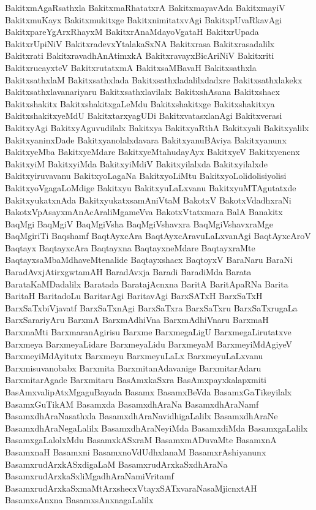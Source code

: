 {BakitxmAgaRsathxla
BakitxmaRhatatxrA
BakitxmayavAda
BakitxmayiV
BakitxmuKayx
Bakitxmukitxge
BakitxnimitatxvAgi
BakitxpUvaRkavAgi
BakitxpareYgArxRhayxM
BakitxrAnaMdayoVgataH
BakitxrUpada
BakitxrUpiNiV
BakitxradevxYtalakaSxNA
Bakitxrasa
Bakitxrasadalilx
Bakitxrati
BakitxravadhAnAtimxkA
BakitxravayxBicAriNiV
Bakitxriti
BakitxrucayxteV
BakitxrutatxmA
BakitxsaMBavaH
Bakitxsathxla
BakitxsathxlaM
Bakitxsathxlada
Bakitxsathxladalilxdadxre
Bakitxsathxlakekx
Bakitxsathxlavanariyaru
Bakitxsathxlavilalx
BakitxshAsana
Bakitxshacx
Bakitxshakitx
BakitxshakitxgaLeMdu
Bakitxshakitxge
Bakitxshakitxya
BakitxshakitxyeMdU
BakitxtarxyagUDi
BakitxvatasxlanAgi
Bakitxverasi
BakitxyAgi
BakitxyAguvudilalx
Bakitxya
BakitxyaRthA
Bakitxyali
Bakitxyalilx
BakitxyaninxDade
Bakitxyanolalxdavara
BakitxyanuBAviya
Bakitxyanunx
BakitxyeMba
BakitxyeMdare
BakitxyeMtahudayAyx
BakitxyeV
Bakitxyenenx
BakitxyiM
BakitxyiMda
BakitxyiMdiV
Bakitxyilalxda
Bakitxyilalxde
Bakitxyiruvavanu
BakitxyoLagaNa
BakitxyoLiMtu
BakitxyoLolidolisiyolisi
BakitxyoVgagaLoMdige
Bakitxyu
BakitxyuLaLxvanu
BakitxyuMTAgutatxde
BakitxyukatxnAda
BakitxyukatxsamAniVtaM
BakotxV
BakotxVdadhxraNi
BakotxVpAsayxmAnAcAraliMgameVva
BakotxVtatxmara
BalA
Banakitx
BaqMgi
BaqMgiV
BaqMgiVsha
BaqMgiVshavxra
BaqMgiVshavxraMge
BaqMgiriTi
Baqshamf
BaqtAyxcAra
BaqtAyxcAravuLaLxvanAgi
BaqtAyxcAroV
Baqtayx
BaqtayxcAra
Baqtayxna
BaqtayxneMdare
BaqtayxraMte
BaqtayxsaMbaMdhaveMtenalide
Baqtayxshacx
BaqtoyxV
BaraNaru
BaraNi
BaradAvxjAtirxgwtamAH
BaradAvxja
Baradi
BaradiMda
Barata
BarataKaMDadalilx
Baratada
BaratajAcnxna
BaritA
BaritApaRNa
Barita
BaritaH
BaritadoLu
BaritarAgi
BaritavAgi
BarxSATxH
BarxSaTxH
BarxSaTxbiVjavatf
BarxSaTxnAgi
BarxSaTxra
BarxSaTxru
BarxSaTxrugaLa
BarxSarariyAru
BarxmA
BarxmAdhiVna
BarxmAdhiVnaru
BarxmaH
BarxmaMti
BarxmaranAgirisu
Barxme
BarxmegaLigU
BarxmegaLirutatxve
Barxmeya
BarxmeyaLidare
BarxmeyaLidu
BarxmeyaM
BarxmeyiMdAgiyeV
BarxmeyiMdAyitutx
Barxmeyu
BarxmeyuLaLx
BarxmeyuLaLxvanu
Barxmisuvanobabx
Barxmita
BarxmitanAdavanige
BarxmitarAdaru
BarxmitarAgade
Barxmitaru
BasAmxkaSxra
BasAmxpayxkalapxmiti
BasAmxvalipAtxMgaguBayada
Basamx
BasamxBeVda
BasamxGaTikeyilalx
BasamxGuTikAM
Basamxda
BasamxdhAraNa
BasamxdhAraNamf
BasamxdhAraNasathxla
BasamxdhAraNavidhigaLalilx
BasamxdhAraNe
BasamxdhAraNegaLalilx
BasamxdhAraNeyiMda
BasamxdiMda
BasamxgaLalilx
BasamxgaLalolxMdu
BasamxkASxraM
BasamxmADuvaMte
BasamxnA
BasamxnaH
Basamxni
BasamxnoVdUdhxlanaM
BasamxrAshiyanunx
BasamxrudArxkASxdigaLaM
BasamxrudArxkaSxdhAraNa
BasamxrudArxkaSxliMgadhAraNamiVritamf
BasamxrudArxkaSxmaMtArxshecxVtayxSATxvaraNasaMjicnxtAH
BasamxsAnxna
BasamxsAnxnagaLalilx
}
